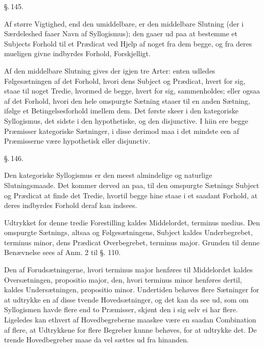 \documentclass[12pt]{book}
\def\textit#1{#1}%
\def\emph#1{#1}%
\newcommand{\parag}[1]{%
  \par\vspace{0.9\baselineskip}%
  {\centering\textit{\S.\,#1.}\par}%
  \vspace{0.35\baselineskip}%
  \noindent\hspace{\parindent}\ignorespaces
}
\newcommand{\opage}[1]{\marginnote{\footnotesize\textit{[#1]}}}
\begin{document}
\parag{145}

Af større Vigtighed, end den umiddelbare, er den middelbare Slutning (der i
Særdeleshed faaer Navn af Syllogismus); den gaaer ud paa at bestemme et
Subjects Forhold til et Prædicat ved Hjelp af noget fra dem begge, og fra deres
mueligen givne indbyrdes Forhold, Forskjelligt.

Af den middelbare Slutning gives der igjen tre Arter: enten udledes
Følgesætningen af det Forhold, hvori dens Subject og Prædicat, hvert for sig,
staae til noget Tredie, hvormed de begge, hvert for sig, sammenholdes; eller
ogsaa af
\opage{335} det Forhold, hvori den hele omspurgte Sætning staaer til en anden Sætning,
ifølge et Betingelsesforhold imellem dem. Det første skeer i den kategoriske
Syllogismus, det sidste i den hypothetiske, og den disjunctive. I hiin ere
begge Præmisser kategoriske Sætninger, i disse derimod maa i det mindste een af
Præmisserne være hypothetisk eller disjunctiv.

\parag{146}

Den kategoriske Syllogismus er den meest almindelige og naturlige
Slutningsmaade. Det kommer derved an paa, til den omspurgte Sætnings Subject og
Prædicat at finde det Tredie, hvortil begge hine staae i et saadant Forhold, at
deres indbyrdes Forhold deraf kan indsees.

Udtrykket for denne tredie Forestilling kaldes \emph{Middelordet},
\textit{terminus medius}. Den omspurgte Sætnings, altsaa og Følgesætningens,
Subject kaldes \emph{Underbegrebet}, \textit{terminus minor}, dens Prædicat
\emph{Overbegrebet}, \textit{terminus major}. Grunden til denne Benævnelse sees
af Anm. 2 til §. 110.

Den af Forudsætningerne, hvori \textit{terminus major} henføres til
\emph{Middelordet} kaldes \emph{Oversætningen}, \textit{propositio major}, den,
hvori \textit{terminus minor} henføres dertil, kaldes \emph{Undersætningen},
\textit{propositio minor}. Undertiden behøves flere Sætninger for at udtrykke
en af disse tvende Hovedsætninger, og det kan da see ud, som om Syllogismen
havde flere end to Præmisser, skjønt den i sig selv ei har flere. Ligeledes kan
ethvert
\opage{336} %
af Hovedbegreberne maaskee være en saadan Combination af flere, at Udtrykkene
for flere Begreber kunne behøves, for at udtrykke det. De trende Hovedbegreber
maae da vel sættes ud fra hinanden.
\end{document}
